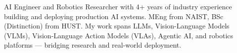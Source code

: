 %
%
%
\par{
AI Engineer and Robotics Researcher with 4+ years of industry experience building and deploying production AI systems.
MEng from NAIST, BSc (Distinction) from HUST.
My work spans LLMs, Vision-Language Models (VLMs), Vision-Language Action Models (VLAs), Agentic AI, and robotics platforms --- bridging research and real-world deployment.
}